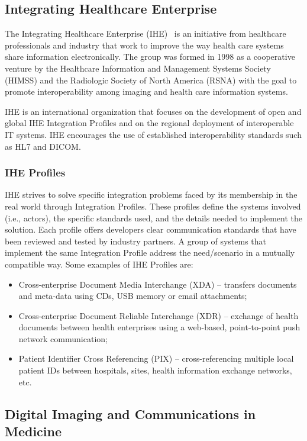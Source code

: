 \subsection{Integrating Healthcare Enterprise} \label{sec:ihe}

The Integrating Healthcare Enterprise (IHE)~\citep{IHE_PROFILES} is an initiative from healthcare professionals and industry that work to improve the way health care systems share information electronically. The group was formed in 1998 as a cooperative venture by the Healthcare Information and Management Systems Society (HIMSS) and the Radiologic Society of North America (RSNA) with the goal to promote interoperability among imaging and health care information systems. 

IHE is an international organization that focuses on the development of open and global IHE Integration Profiles and on the regional deployment of interoperable IT systems. IHE encourages the use of established interoperability standards such as HL7 and DICOM.

\subsubsection{IHE Profiles} \label{sec:ihe_profiles}
IHE strives to solve specific integration problems faced by its membership in the real world through Integration Profiles. These profiles define the systems involved (i.e., actors), the specific standards used, and the details needed to implement the solution. Each profile offers developers clear communication standards that have been reviewed and tested by industry partners. A group of systems that implement the same Integration Profile address the need/scenario in a mutually compatible way. Some examples of IHE Profiles are:
\begin{itemize}
\item Cross-enterprise Document Media Interchange (XDA) -- transfers documents and meta-data using CDs, USB memory or email attachments;
\item Cross-enterprise Document Reliable Interchange (XDR) -- exchange of health documents between health enterprises using a web-based, point-to-point push network communication;
\item Patient Identifier Cross Referencing (PIX) -- cross-referencing multiple local patient IDs between hospitals, sites, health information exchange networks, etc.
\end{itemize}

\subsection{Digital Imaging and Communications in Medicine} \label{sec:dicom}

